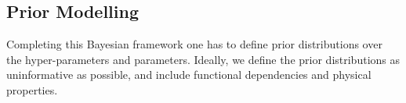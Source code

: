 
\subsection{Prior Modelling}
\label{subsec:PriorModelO3}
Completing this Bayesian framework one has to define prior distributions over the hyper-parameters and parameters.
Ideally, we define the prior distributions as uninformative as possible, and include functional dependencies and physical properties.

